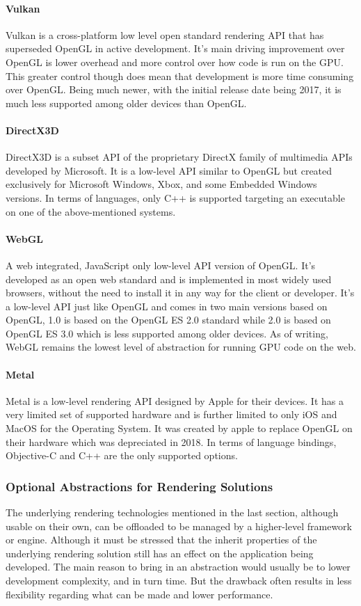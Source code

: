 \paragraph{Vulkan}
Vulkan is a cross-platform low level open standard rendering API that has superseded OpenGL in active development. It’s main driving improvement over OpenGL is lower overhead and more control over how code is run on the GPU. This greater control though does mean that development is more time consuming over OpenGL. Being much newer, with the initial release date being 2017, it is much less supported among older devices than OpenGL.

\paragraph{DirectX3D}
DirectX3D is a subset API of the proprietary DirectX family of multimedia APIs developed by Microsoft. It is a low-level API similar to OpenGL but created exclusively for Microsoft Windows, Xbox, and some Embedded Windows versions. In terms of languages, only C++ is supported targeting an executable on one of the above-mentioned systems.

\paragraph{WebGL}
A web integrated, JavaScript only low-level API version of OpenGL. It’s developed as an open web standard and is implemented in most widely used browsers, without the need to install it in any way for the client or developer. It’s a low-level API just like OpenGL and comes in two main versions based on OpenGL, 1.0 is based on the OpenGL ES 2.0 standard while 2.0 is based on OpenGL ES 3.0 which is less supported among older devices. As of writing, WebGL remains the lowest level of abstraction for running GPU code on the web.

\paragraph{Metal}
Metal is a low-level rendering API designed by Apple for their devices. It has a very limited set of supported hardware and is further limited to only iOS and MacOS for the Operating System. It was created by apple to replace OpenGL on their hardware which was depreciated in 2018. In terms of language bindings, Objective-C and C++ are the only supported options.

\subsubsection{Optional Abstractions for Rendering Solutions}
The underlying rendering technologies mentioned in the last section, although usable on their own, can be offloaded to be managed by a higher-level framework or engine. Although it must be stressed that the inherit properties of the underlying rendering solution still has an effect on the application being developed.
The main reason to bring in an abstraction would usually be to lower development complexity, and in turn time. But the drawback often results in less flexibility regarding what can be made and lower performance.

